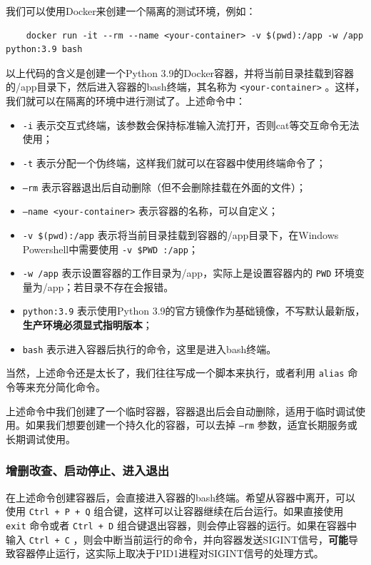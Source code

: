 我们可以使用Docker来创建一个隔离的测试环境，例如：
\begin{verbatim}
    docker run -it --rm --name <your-container> -v $(pwd):/app -w /app python:3.9 bash
\end{verbatim}
以上代码的含义是创建一个Python 3.9的Docker容器，并将当前目录挂载到容器的/app目录下，然后进入容器的bash终端，其名称为 \texttt{<your-container>} 。这样，我们就可以在隔离的环境中进行测试了。上述命令中：
\begin{itemize}
    \item  \texttt{-i} 表示交互式终端，该参数会保持标准输入流打开，否则cat等交互命令无法使用；
    \item  \texttt{-t} 表示分配一个伪终端，这样我们就可以在容器中使用终端命令了；
    \item  \texttt{--rm} 表示容器退出后自动删除（但不会删除挂载在外面的文件）；
    \item  \texttt{--name <your-container>} 表示容器的名称，可以自定义；
    \item  \texttt{-v \$(pwd):/app} 表示将当前目录挂载到容器的/app目录下，在Windows Powershell中需要使用 \texttt{-v \${PWD} :/app}；
    \item  \texttt{-w /app} 表示设置容器的工作目录为/app，实际上是设置容器内的 \texttt{PWD} 环境变量为/app；若目录不存在会报错。
    \item  \texttt{python:3.9} 表示使用Python 3.9的官方镜像作为基础镜像，不写默认最新版，\textbf{生产环境必须显式指明版本}；
    \item  \texttt{bash} 表示进入容器后执行的命令，这里是进入bash终端。
\end{itemize}
当然，上述命令还是太长了，我们往往写成一个脚本来执行，或者利用 \texttt{alias} 命令等来充分简化命令。

上述命令中我们创建了一个临时容器，容器退出后会自动删除，适用于临时调试使用。如果我们想要创建一个持久化的容器，可以去掉 \texttt{--rm} 参数，适宜长期服务或长期调试使用。

\subsubsection{增删改查、启动停止、进入退出}

在上述命令创建容器后，会直接进入容器的bash终端。希望从容器中离开，可以使用 \texttt{Ctrl + P + Q} 组合键，这样可以让容器继续在后台运行。如果直接使用 \texttt{exit} 命令或者 \texttt{Ctrl + D} 组合键退出容器，则会停止容器的运行。如果在容器中输入 \texttt{Ctrl + C} ，则会中断当前运行的命令，并向容器发送SIGINT信号，\textbf{可能}导致容器停止运行，这实际上取决于PID1进程对SIGINT信号的处理方式。

